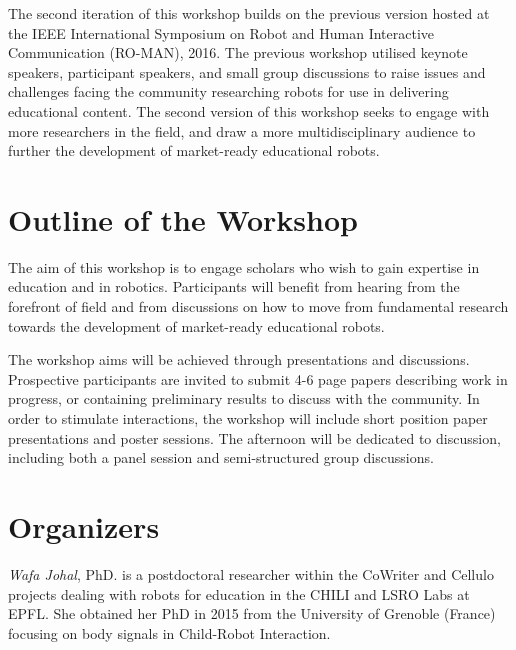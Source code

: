 \documentclass{sig-alternate-05-2015}
\begin{document}
The second iteration of this workshop builds on the previous version hosted at 
the IEEE International Symposium on Robot and Human Interactive Communication 
(RO-MAN), 2016. The previous workshop utilised keynote speakers, participant 
speakers, and small group discussions to raise issues and challenges facing the 
community researching robots for use in delivering educational content. The 
second version of this workshop seeks to engage with more researchers in the 
field, and draw a more multidisciplinary audience to further the development of 
market-ready educational robots.


\section{Outline of the Workshop}
The aim of this workshop is to engage scholars who wish to gain expertise in 
education and in robotics. Participants will benefit from hearing from the 
forefront of field and from discussions on how to move from fundamental research 
towards the development of market-ready educational robots.

The workshop aims will be achieved through presentations and discussions. 
Prospective participants are invited to submit 4-6 page papers describing work in progress, or containing preliminary results to discuss with the community.
In order to stimulate interactions, the workshop will include short position paper presentations and poster sessions. 
The afternoon will be dedicated to discussion, including both a panel session and semi-structured group discussions.


\section{Organizers}
\emph{Wafa Johal}, PhD. is a postdoctoral researcher within the CoWriter and Cellulo projects dealing with robots for education in the CHILI and LSRO Labs at EPFL. She obtained her PhD in 2015 from the University of Grenoble (France) focusing on body signals in Child-Robot Interaction.  
\end{document}
